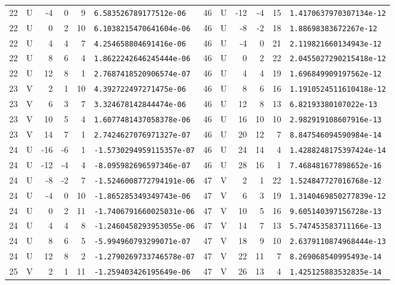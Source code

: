 \begin{longtable}{rcrrrl|rcrrrl}
22 & U & -4 & 0 & 9 & \texttt{6.583526789177512e-06} & 46 & U & -12 & -4 & 15 & \texttt{1.4170637970307134e-12}\\
22 & U & 0 & 2 & 10 & \texttt{6.1038215470641604e-06} & 46 & U & -8 & -2 & 18 & \texttt{1.88698383672267e-12}\\
22 & U & 4 & 4 & 7 & \texttt{4.254658804691416e-06} & 46 & U & -4 & 0 & 21 & \texttt{2.119821660134943e-12}\\
22 & U & 8 & 6 & 4 & \texttt{1.8622242646245444e-06} & 46 & U & 0 & 2 & 22 & \texttt{2.0455027290215418e-12}\\
22 & U & 12 & 8 & 1 & \texttt{2.7687418520906574e-07} & 46 & U & 4 & 4 & 19 & \texttt{1.696849909197562e-12}\\
23 & V & 2 & 1 & 10 & \texttt{4.392722497271475e-06} & 46 & U & 8 & 6 & 16 & \texttt{1.1910524511610418e-12}\\
23 & V & 6 & 3 & 7 & \texttt{3.324678142844474e-06} & 46 & U & 12 & 8 & 13 & \texttt{6.82193380107022e-13}\\
23 & V & 10 & 5 & 4 & \texttt{1.6077481437058378e-06} & 46 & U & 16 & 10 & 10 & \texttt{2.982919108607916e-13}\\
23 & V & 14 & 7 & 1 & \texttt{2.7424627076971327e-07} & 46 & U & 20 & 12 & 7 & \texttt{8.847546094590984e-14}\\
24 & U & -16 & -6 & 1 & \texttt{-1.5730294959115357e-07} & 46 & U & 24 & 14 & 4 & \texttt{1.4288248175397424e-14}\\
24 & U & -12 & -4 & 4 & \texttt{-8.095982696597346e-07} & 46 & U & 28 & 16 & 1 & \texttt{7.468481677898652e-16}\\
24 & U & -8 & -2 & 7 & \texttt{-1.5246008772794191e-06} & 47 & V & 2 & 1 & 22 & \texttt{1.524847727016768e-12}\\
24 & U & -4 & 0 & 10 & \texttt{-1.865285349349743e-06} & 47 & V & 6 & 3 & 19 & \texttt{1.3140469850277839e-12}\\
24 & U & 0 & 2 & 11 & \texttt{-1.7406791660025031e-06} & 47 & V & 10 & 5 & 16 & \texttt{9.605140397156728e-13}\\
24 & U & 4 & 4 & 8 & \texttt{-1.2460458293953055e-06} & 47 & V & 14 & 7 & 13 & \texttt{5.747453583711166e-13}\\
24 & U & 8 & 6 & 5 & \texttt{-5.994960793299071e-07} & 47 & V & 18 & 9 & 10 & \texttt{2.6379110874968444e-13}\\
24 & U & 12 & 8 & 2 & \texttt{-1.2790269733746578e-07} & 47 & V & 22 & 11 & 7 & \texttt{8.269068540995493e-14}\\
25 & V & 2 & 1 & 11 & \texttt{-1.259403426195649e-06} & 47 & V & 26 & 13 & 4 & \texttt{1.425125883532835e-14}\\

\end{longtable}

